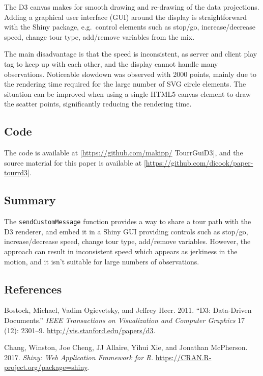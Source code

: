The D3 canvas makes for smooth drawing and re-drawing of the data
projections. Adding a graphical user interface (GUI) around the display
is straightforward with the Shiny package, e.g.~control elements such as
stop/go, increase/decrease speed, change tour type, add/remove variables
from the mix.

The main disadvantage is that the speed is inconsistent, as server and
client play tag to keep up with each other, and the display cannot
handle many observations. Noticeable slowdown was observed with 2000
points, mainly due to the rendering time required for the large
number of SVG circle elements. The situation can be improved when using
a single HTML5 canvas element to draw the scatter points, significantly
reducing the rendering time.

\subsection{Code}\label{code}

The code is available at {[}\url{https://github.com/makipp/}
TourrGuiD3{]}, and the source material for this paper is available at
{[}\url{https://github.com/dicook/paper-tourrd3}{]}.

\subsection{Summary}\label{summary}

The \texttt{sendCustomMessage} function provides a way to share a tour
path with the D3 renderer, and embed it in a Shiny GUI providing
controls such as stop/go, increase/decrease speed, change tour type,
add/remove variables. However, the approach can result in inconsistent
speed which appears as jerkiness in the motion, and it isn't suitable
for large numbers of observations.

\subsection{References}\label{references}


Bostock, Michael, Vadim Ogievetsky, and Jeffrey Heer. 2011. ``D3:
Data-Driven Documents.'' \emph{IEEE Transactions on Visualization and
Computer Graphics} 17 (12): 2301--9.
\url{http://vis.stanford.edu/papers/d3}.

Chang, Winston, Joe Cheng, JJ Allaire, Yihui Xie, and Jonathan
McPherson. 2017. \emph{Shiny: Web Application Framework for R}.
\url{https://CRAN.R-project.org/package=shiny}.

